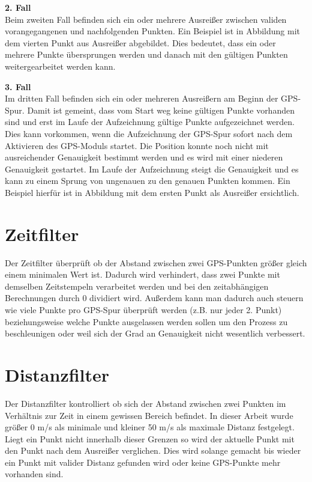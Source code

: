 \textbf{2. Fall}\\
Beim zweiten Fall befinden sich ein oder mehrere Ausreißer zwischen validen vorangegangenen und nachfolgenden Punkten. Ein Beispiel ist in Abbildung  mit dem vierten Punkt aus Ausreißer abgebildet. Dies bedeutet, dass ein oder mehrere Punkte übersprungen werden und danach mit den gültigen Punkten weitergearbeitet werden kann.


\textbf{3. Fall}\\
Im dritten Fall befinden sich ein oder mehreren Ausreißern am Beginn der GPS-Spur. Damit ist gemeint, dass vom Start weg keine gültigen Punkte vorhanden sind und erst im Laufe der Aufzeichnung gültige Punkte aufgezeichnet werden. Dies kann vorkommen, wenn die Aufzeichnung der GPS-Spur sofort nach dem Aktivieren des GPS-Moduls startet. Die Position konnte noch nicht mit ausreichender Genauigkeit bestimmt werden und es wird mit einer niederen Genauigkeit gestartet. Im Laufe der Aufzeichnung steigt die Genauigkeit und es kann zu einem Sprung von ungenauen zu den genauen Punkten kommen. Ein Beispiel hierfür ist in Abbildung  mit dem ersten Punkt als Ausreißer ersichtlich.


\section{Zeitfilter}
Der Zeitfilter überprüft ob der Abstand zwischen zwei GPS-Punkten größer gleich einem minimalen Wert ist. Dadurch wird verhindert, dass zwei Punkte mit demselben Zeitstempeln verarbeitet werden und bei den zeitabhängigen Berechnungen durch 0 dividiert wird. Außerdem kann man dadurch auch steuern wie viele Punkte pro GPS-Spur überprüft werden  (z.B. nur jeder 2. Punkt) beziehungsweise welche Punkte ausgelassen werden sollen um den Prozess zu beschleunigen oder weil sich der Grad an Genauigkeit nicht wesentlich verbessert.

\section{Distanzfilter}
Der Distanzfilter kontrolliert ob sich der Abstand zwischen zwei Punkten im Verhältnis zur Zeit in einem gewissen Bereich befindet. In dieser Arbeit wurde größer 0 m/s als minimale und kleiner 50 m/s als maximale Distanz festgelegt. Liegt ein Punkt nicht innerhalb dieser Grenzen so wird der aktuelle Punkt mit den Punkt nach dem Ausreißer verglichen. Dies wird solange gemacht bis wieder ein Punkt mit valider Distanz gefunden wird oder keine GPS-Punkte mehr vorhanden sind.

